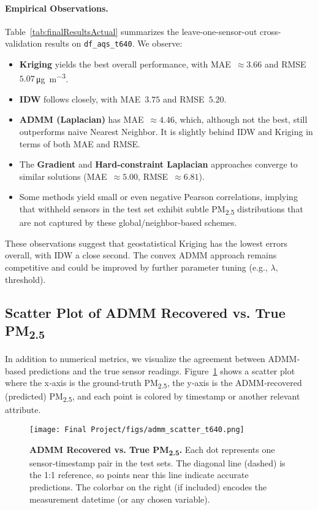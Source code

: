 \documentclass[12pt]{article}                                %
\begin{document}
\paragraph{Empirical Observations.}  %
Table~\ref{tab:finalResultsActual} summarizes the leave-one-sensor-out cross-validation 
results on \texttt{df\_aqs\_t640}. We observe:
\begin{itemize}
    \item \textbf{Kriging} yields the best overall performance, with MAE~$\approx 3.66$ 
    and RMSE~$5.07$\,\si{\micro\gram\per\cubic\meter}.
    \item \textbf{IDW} follows closely, with MAE~$3.75$ and RMSE~$5.20$.
    \item \textbf{ADMM (Laplacian)} has MAE~$\approx 4.46$, which, although not the best, 
    still outperforms naive Nearest Neighbor. It is slightly behind IDW and Kriging in terms 
    of both MAE and RMSE.
    \item The \textbf{Gradient} and \textbf{Hard-constraint Laplacian} approaches converge 
    to similar solutions (MAE~$\approx 5.00$, RMSE~$\approx 6.81$).
    \item Some methods yield small or even negative Pearson correlations, implying that 
    withheld sensors in the test set exhibit subtle PM\textsubscript{2.5} distributions that 
    are not captured by these global/neighbor-based schemes.
\end{itemize}

These observations suggest that geostatistical Kriging has the lowest errors overall, with 
IDW a close second. The convex ADMM approach remains competitive and could be improved by 
further parameter tuning (e.g., $\lambda$, threshold). 

\subsection{Scatter Plot of ADMM Recovered vs. True PM\texorpdfstring{\textsubscript{2.5}}{}}

In addition to numerical metrics, we visualize the agreement between ADMM‐based predictions and the true sensor readings. Figure~\ref{fig:admmScatter} shows a scatter plot where the x‐axis is the ground‐truth PM\textsubscript{2.5}, the y‐axis is the ADMM‐recovered (predicted) PM\textsubscript{2.5}, and each point is colored by timestamp or another relevant attribute.

\begin{figure}[H]  %
    \centering
    \texttt{[image: Final Project/figs/admm\_scatter\_t640.png]}
    \caption{\textbf{ADMM Recovered vs. True PM\textsubscript{2.5}.} 
    Each dot represents one sensor‐timestamp pair in the test sets. The diagonal line (dashed) is the 1:1 reference, so points near this line indicate accurate predictions. The colorbar on the right (if included) encodes the measurement datetime (or any chosen variable).}
    \label{fig:admmScatter}
\end{figure}
\end{document}
